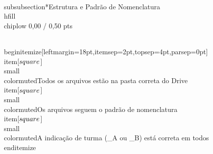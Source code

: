\documentclass[11pt, a4paper]{article}
\newcommand{\chiplow}[1]{\colorbox{crimsondim}{\color{crimson}\semibold\small\strut\ #1\ }}
\begin{document}
\\subsubsection*{Estrutura e Padrão de Nomenclatura \\hfill {\\chiplow 0,00 / 0,50 pts}}

\\begin{itemize}[leftmargin=18pt,itemsep=2pt,topsep=4pt,parsep=0pt]
  \\item[$\\square$] {\\small\\color{muted}Todos os arquivos estão na pasta correta do Drive}
  \\item[$\\square$] {\\small\\color{muted}Os arquivos seguem o padrão de nomenclatura}
  \\item[$\\square$] {\\small\\color{muted}A indicação de turma (\_A ou \_B) está correta em todos}
\\end{itemize}
\end{document}
